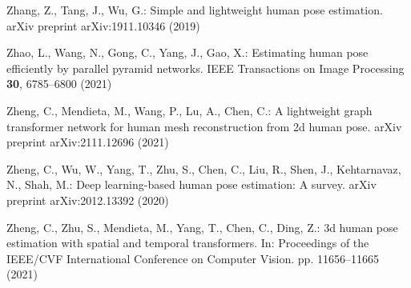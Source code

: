 \documentclass[runningheads]{llncs}
\begin{document}
\begin{thebibliography}{10}
Zhang, Z., Tang, J., Wu, G.: Simple and lightweight human pose estimation.
  arXiv preprint arXiv:1911.10346  (2019)

Zhao, L., Wang, N., Gong, C., Yang, J., Gao, X.: Estimating human pose
  efficiently by parallel pyramid networks. IEEE Transactions on Image
  Processing  \textbf{30},  6785--6800 (2021)

Zheng, C., Mendieta, M., Wang, P., Lu, A., Chen, C.: A lightweight graph
  transformer network for human mesh reconstruction from 2d human pose. arXiv
  preprint arXiv:2111.12696  (2021)

Zheng, C., Wu, W., Yang, T., Zhu, S., Chen, C., Liu, R., Shen, J., Kehtarnavaz,
  N., Shah, M.: Deep learning-based human pose estimation: A survey. arXiv
  preprint arXiv:2012.13392  (2020)

Zheng, C., Zhu, S., Mendieta, M., Yang, T., Chen, C., Ding, Z.: 3d human pose
  estimation with spatial and temporal transformers. In: Proceedings of the
  IEEE/CVF International Conference on Computer Vision. pp. 11656--11665 (2021)

\end{thebibliography}
 
\end{document}
